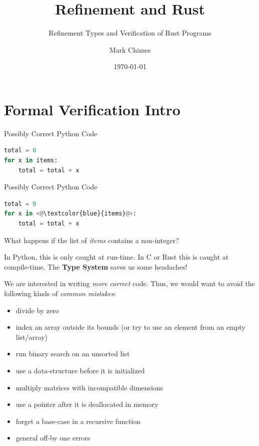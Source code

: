 \documentclass{beamer}
\title{Refinement and Rust}
\subtitle{Refinement Types and Verification of Rust Programs}
\author{Mark Chimes}
\date{\today}
\begin{document}
\begin{frame}
    \titlepage
\end{frame}
%

\section{Formal Verification Intro}

\begin{frame}[fragile]
\begin{block}{Possibly Correct Python Code}
\begin{lstlisting}[language=Python]
total = 0
for x in items:
    total = total + x 
\end{lstlisting}
\end{block}
\end{frame}

\begin{frame}[fragile]
\begin{block}{Possibly Correct Python Code}
\begin{lstlisting}[language=Python]
total = 0
for x in <@\textcolor{blue}{items}@>:
    total = total + x 
\end{lstlisting}
\end{block}

What happens if the list of \emph{items} contains a non-integer?

In Python, this is only caught at run-time. In C or Rust this is caught at compile-time. The \textbf{Type System} saves us some headaches!
\end{frame}


\begin{frame} 
We are interested in writing \emph{more correct} code. Thus, we would want to avoid the following kinds of \emph{common mistakes}: 

\begin{block}{}
\begin{itemize}
\item divide by zero
\item index an array outside its bounds (or try to use an element from an empty list/array)
\item run binary search on an unsorted list
\item use a data-structure before it is initialized
\item multiply matrices with incompatible dimensions
\item use a pointer after it is deallocated in memory
\item forget a base-case in a recursive function
\item general off-by one errors
\end{itemize}
\end{block}

\end{frame}
\end{document}
